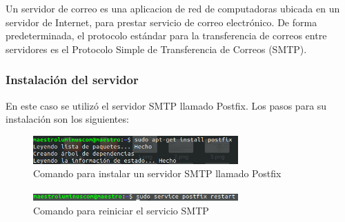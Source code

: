 Un servidor de correo es una aplicacion de red de computadoras ubicada en un servidor de Internet, para prestar servicio de correo electrónico. De forma predeterminada, el protocolo estándar para la transferencia de correos entre servidores es el Protocolo Simple de Transferencia de Correos (SMTP).
\subsubsection{Instalación del servidor}
En este caso se utilizó el servidor SMTP llamado Postfix. Los pasos para su instalación son los siguientes:
\begin{figure}[!htbp]
	\hypertarget{fig:instalacionSMTP}{\hspace{1pt}}
	\begin{center}
		\includegraphics[width=0.7\textwidth]{desarrollo/tarea2/img/instalacionSMTP.png}
		\caption{Comando para instalar un servidor SMTP llamado Postfix}
		\label{fig:instalacionSMTP}
	\end{center}
\end{figure}
\pagebreak
\begin{figure}[!htbp]
	\hypertarget{fig:reiniciarSMTP}{\hspace{1pt}}
	\begin{center}
		\includegraphics[width=0.7\textwidth]{desarrollo/tarea2/img/reiniciarSMTP.png}
		\caption{Comando para reiniciar el servicio SMTP}
		\label{fig:reiniciarSMTP}
	\end{center}
\end{figure}
